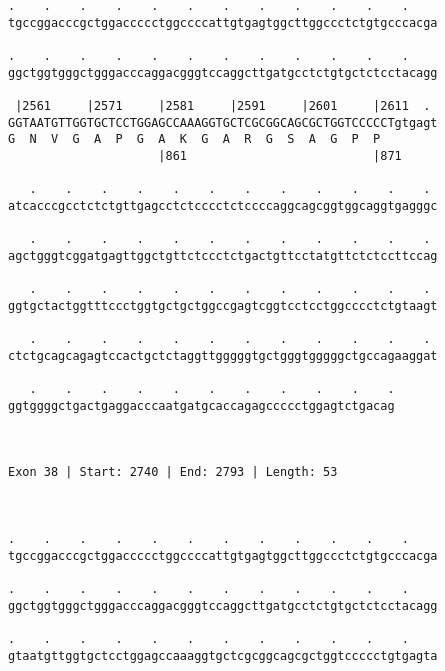\documentclass{article}
\begin{document}
\begin{Verbatim}
.    .    .    .    .    .    .    .    .    .    .    .    
tgccggacccgctggaccccctggccccattgtgagtggcttggccctctgtgcccacga
                                                            
.    .    .    .    .    .    .    .    .    .    .    .    
ggctggtgggctgggacccaggacgggtccaggcttgatgcctctgtgctctcctacagg
                                                            
 |2561     |2571     |2581     |2591     |2601     |2611  . 
GGTAATGTTGGTGCTCCTGGAGCCAAAGGTGCTCGCGGCAGCGCTGGTCCCCCTgtgagt
G  N  V  G  A  P  G  A  K  G  A  R  G  S  A  G  P  P        
                     |861                          |871     
  
   .    .    .    .    .    .    .    .    .    .    .    . 
atcacccgcctctctgttgagcctctcccctctccccaggcagcggtggcaggtgagggc
                                                            
   .    .    .    .    .    .    .    .    .    .    .    . 
agctgggtcggatgagttggctgttctccctctgactgttcctatgttctctccttccag
                                                            
   .    .    .    .    .    .    .    .    .    .    .    . 
ggtgctactggtttccctggtgctgctggccgagtcggtcctcctggcccctctgtaagt
                                                            
   .    .    .    .    .    .    .    .    .    .    .    . 
ctctgcagcagagtccactgctctaggttgggggtgctgggtgggggctgccagaaggat
                                                            
   .    .    .    .    .    .    .    .    .    .    .
ggtggggctgactgaggacccaatgatgcaccagagccccctggagtctgacag
                                                      
                                                      
 
Exon 38 | Start: 2740 | End: 2793 | Length: 53



.    .    .    .    .    .    .    .    .    .    .    .    
tgccggacccgctggaccccctggccccattgtgagtggcttggccctctgtgcccacga
                                                            
.    .    .    .    .    .    .    .    .    .    .    .    
ggctggtgggctgggacccaggacgggtccaggcttgatgcctctgtgctctcctacagg
                                                            
.    .    .    .    .    .    .    .    .    .    .    .    
gtaatgttggtgctcctggagccaaaggtgctcgcggcagcgctggtccccctgtgagta
                                                            

\end{Verbatim}
\end{document}
